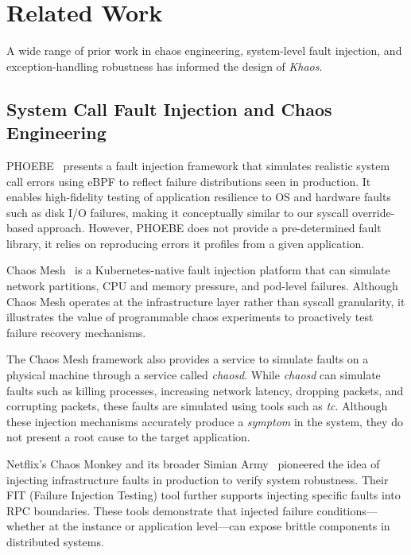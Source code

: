 \section{Related Work}
\label{sec:related_work}

A wide range of prior work in chaos engineering, system-level fault injection, and exception-handling robustness has informed the design of \textit{Khaos}.

\subsection{System Call Fault Injection and Chaos Engineering}

PHOEBE~\cite{Zhang2020phoebe} presents a fault injection framework that simulates realistic system call errors using eBPF to reflect failure distributions seen in production. It enables high-fidelity testing of application resilience to OS and hardware faults such as disk I/O failures, making it conceptually similar to our syscall override-based approach. However, PHOEBE does not provide a pre-determined fault library, it relies on reproducing errors it profiles from a given application.

Chaos Mesh~\cite{chaosmesh2023} is a Kubernetes-native fault injection platform that can simulate network partitions, CPU and memory pressure, and pod-level failures. Although Chaos Mesh operates at the infrastructure layer rather than syscall granularity, it illustrates the value of programmable chaos experiments to proactively test failure recovery mechanisms.

The Chaos Mesh framework also provides a service to simulate faults on a physical machine through a service called \textit{chaosd}. While \textit{chaosd} can simulate faults such as killing processes, increasing network latency, dropping packets, and corrupting packets, these faults are simulated using tools such as \textit{tc}. Although these injection mechanisms accurately produce a \textit{symptom} in the system, they do not present a root cause to the target application.

Netflix's Chaos Monkey and its broader Simian Army~\cite{netflixchaosmonkey} pioneered the idea of injecting infrastructure faults in production to verify system robustness. Their FIT (Failure Injection Testing) tool further supports injecting specific faults into RPC boundaries. These tools demonstrate that injected failure conditions—whether at the instance or application level—can expose brittle components in distributed systems.

